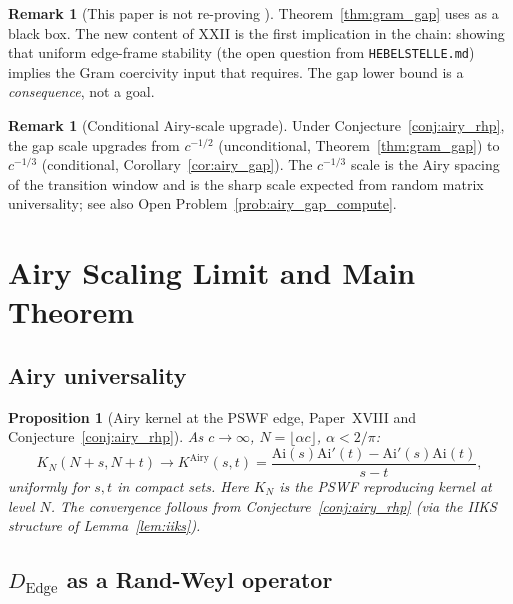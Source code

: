 \documentclass[12pt,a4paper]{amsart}
\newtheorem{proposition}[theorem]{Proposition}
\theoremstyle{definition}
\newtheorem{remark}[theorem]{Remark}
\newcommand{\Dedge}{D_{\mathrm{Edge}}}
\begin{document}
\begin{remark}[This paper is not re-proving \cite{Paper13b}]
Theorem~\ref{thm:gram_gap} uses \cite{Paper13b} as a black box.
The new content of XXII is the first implication in the chain:
showing that uniform edge-frame stability (the open question
from \texttt{HEBELSTELLE.md}) implies the Gram coercivity input
that \cite{Paper13b} requires.
The gap lower bound is a \emph{consequence}, not a goal.
\end{remark}

\begin{remark}[Conditional Airy-scale upgrade]
Under Conjecture~\ref{conj:airy_rhp}, the gap scale upgrades
from $c^{-1/2}$ (unconditional, Theorem~\ref{thm:gram_gap})
to $c^{-1/3}$ (conditional, Corollary~\ref{cor:airy_gap}).
The $c^{-1/3}$ scale is the Airy spacing of the transition
window and is the sharp scale expected from random matrix
universality; see also Open Problem~\ref{prob:airy_gap_compute}.
\end{remark}

\section{Airy Scaling Limit and Main Theorem}\label{sec:main}

\subsection{Airy universality}

\begin{proposition}[Airy kernel at the PSWF edge,
Paper~XVIII and Conjecture~\ref{conj:airy_rhp}]%
\label{prop:airy_univ}
As $c\to\infty$, $N = \lfloor\alpha c\rfloor$,
$\alpha < 2/\pi$:
\[
  K_N(N+s, N+t)
  \to K^{\mathrm{Airy}}(s,t)
  = \frac{\mathrm{Ai}(s)\mathrm{Ai}'(t)
        - \mathrm{Ai}'(s)\mathrm{Ai}(t)}{s-t},
\]
uniformly for $s,t$ in compact sets.
Here $K_N$ is the PSWF reproducing kernel at level $N$.
The convergence follows from Conjecture~\ref{conj:airy_rhp}
(via the IIKS structure of Lemma~\ref{lem:iiks}).
\end{proposition}

\subsection{$\Dedge$ as a Rand-Weyl operator}
\end{document}

